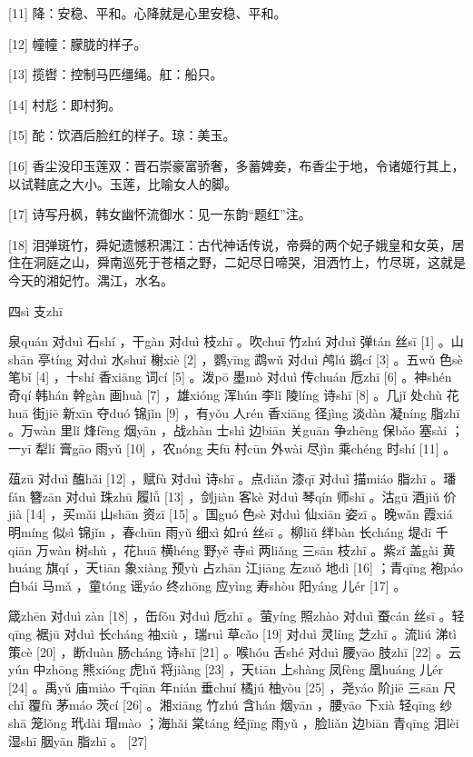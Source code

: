 \documentclass[12pt,UTF8]{ctexbook}
\begin{document}
[11] 降：安稳、平和。心降就是心里安稳、平和。

[12] 幢幢：朦胧的样子。

[13] 揽辔：控制马匹缰绳。舡：船只。

[14] 村尨：即村狗。

[15] 酡：饮酒后脸红的样子。琼：美玉。

[16] 香尘没印玉莲双：晋石崇豪富骄奢，多蓄婢妾，布香尘于地，令诸姬行其上，以试鞋底之大小。玉莲，比喻女人的脚。

[17] 诗写丹枫，韩女幽怀流御水：见一东韵“题红”注。

[18] 泪弹斑竹，舜妃遗憾积湡江：古代神话传说，帝舜的两个妃子娥皇和女英，居住在洞庭之山，舜南巡死于苍梧之野，二妃尽日啼哭，泪洒竹上，竹尽斑，这就是今天的湘妃竹。湡江，水名。





四sì 支zhī


泉quán 对duì 石shí ，干gàn 对duì 枝zhī 。吹chuī 竹zhú 对duì 弹tán 丝sī [1] 。山shān 亭tíng 对duì 水shuǐ 榭xiè [2] ，鹦yīng 鹉wǔ 对duì 鸬lú 鹚cí [3] 。五wǔ 色sè 笔bǐ [4] ，十shí 香xiāng 词cí [5] 。泼pō 墨mò 对duì 传chuán 卮zhī [6] 。神shén 奇qí 韩hán 幹gàn 画huà [7] ，雄xióng 浑hún 李lǐ 陵líng 诗shī [8] 。几jǐ 处chù 花huā 街jiē 新xīn 夺duó 锦jǐn [9] ，有yǒu 人rén 香xiāng 径jìng 淡dàn 凝níng 脂zhī 。万wàn 里lǐ 烽fēng 烟yān ，战zhàn 士shì 边biān 关guān 争zhēng 保bǎo 塞sài ；一yī 犁lí 膏gāo 雨yǔ [10] ，农nóng 夫fū 村cūn 外wài 尽jìn 乘chéng 时shí [11] 。

葅zū 对duì 醢hǎi [12] ，赋fù 对duì 诗shī 。点diǎn 漆qī 对duì 描miáo 脂zhī 。璠fán 簪zān 对duì 珠zhū 履lǚ [13] ，剑jiàn 客kè 对duì 琴qín 师shī 。沽gū 酒jiǔ 价jià [14] ，买mǎi 山shān 资zī [15] 。国guó 色sè 对duì 仙xiān 姿zī 。晚wǎn 霞xiá 明míng 似sì 锦jǐn ，春chūn 雨yǔ 细xì 如rú 丝sī 。柳liǔ 绊bàn 长cháng 堤dī 千qiān 万wàn 树shù ，花huā 横héng 野yě 寺sì 两liǎng 三sān 枝zhī 。紫zǐ 盖gài 黄huáng 旗qí ，天tiān 象xiàng 预yù 占zhān 江jiāng 左zuǒ 地dì [16] ；青qīng 袍páo 白bái 马mǎ ，童tóng 谣yáo 终zhōng 应yìng 寿shòu 阳yáng 儿ér [17] 。

箴zhēn 对duì zàn [18] ，缶fǒu 对duì 卮zhī 。萤yíng 照zhào 对duì 蚕cán 丝sī 。轻qīng 裾jū 对duì 长cháng 袖xiù ，瑞ruì 草cǎo [19] 对duì 灵líng 芝zhī 。流liú 涕tì 策cè [20] ，断duàn 肠cháng 诗shī [21] 。喉hóu 舌shé 对duì 腰yāo 肢zhī [22] 。云yún 中zhōng 熊xióng 虎hǔ 将jiàng [23] ，天tiān 上shàng 凤fèng 凰huáng 儿ér [24] 。禹yǔ 庙miào 千qiān 年nián 垂chuí 橘jú 柚yòu [25] ，尧yáo 阶jiē 三sān 尺chǐ 覆fù 茅máo 茨cí [26] 。湘xiāng 竹zhú 含hán 烟yān ，腰yāo 下xià 轻qīng 纱shā 笼lǒng 玳dài 瑁mào ；海hǎi 棠táng 经jīng 雨yǔ ，脸liǎn 边biān 青qīng 泪lèi 湿shī 胭yān 脂zhī 。 [27]
\end{document}
